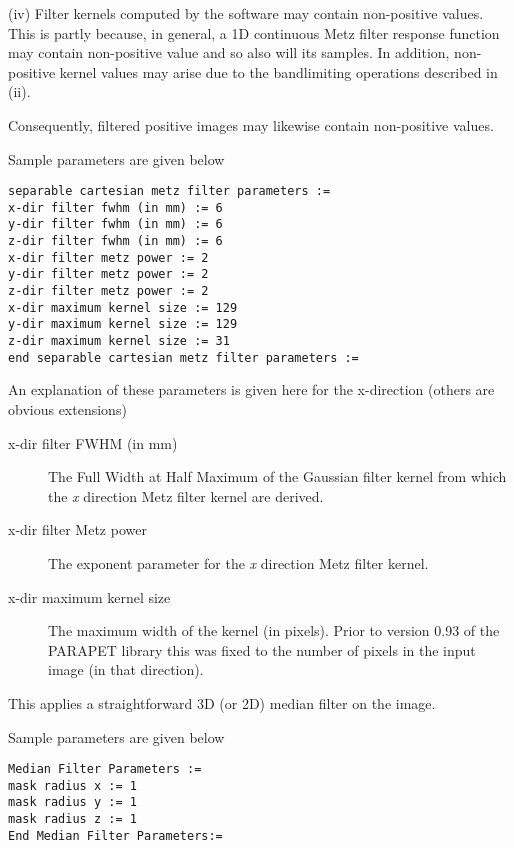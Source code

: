 \documentclass{article}
\begin{document}
(iv) Filter kernels computed by the software may contain non-positive 
values. This is partly because, in general, a 1D continuous Metz 
filter response function may contain non-positive value and so 
also will its samples. In addition, non-positive kernel values 
may arise due to the bandlimiting operations described in (ii). 



Consequently, filtered positive images may likewise contain non-positive 
values. 

{ 
}

Sample parameters are given below

\begin{verbatim}
separable cartesian metz filter parameters :=
x-dir filter fwhm (in mm) := 6
y-dir filter fwhm (in mm) := 6
z-dir filter fwhm (in mm) := 6
x-dir filter metz power := 2
y-dir filter metz power := 2
z-dir filter metz power := 2
x-dir maximum kernel size := 129
y-dir maximum kernel size := 129
z-dir maximum kernel size := 31
end separable cartesian metz filter parameters := 
\end{verbatim}


An explanation of these parameters is given here for the x-direction 
(others are obvious extensions)
\begin{description}
\item[x-dir filter FWHM (in mm)]
The Full Width at Half Maximum of the Gaussian filter kernel 
from which the \textit{x} direction Metz filter kernel are derived.

\item[x-dir filter Metz power]
The exponent parameter for the \textit{x} direction Metz filter kernel.

\item[x-dir maximum kernel size]
The maximum width of the kernel (in pixels). Prior to version 
0.93 of the PARAPET library this was fixed to the number of pixels 
in the input image (in that direction).
\end{description}

{ 
}
\label{sec:median}
This applies a straightforward 3D (or 2D) median filter on the 
image.

{ 
}

Sample parameters are given below

\begin{verbatim}
Median Filter Parameters := 
mask radius x := 1  
mask radius y := 1 
mask radius z := 1 
End Median Filter Parameters:=
\end{verbatim}
\end{document}
